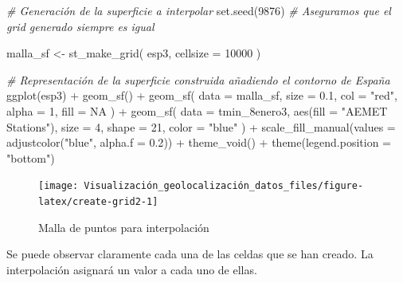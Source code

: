 \documentclass[
]{report}
\newenvironment{Shaded}{\begin{snugshade}}{\end{snugshade}}
\newcommand{\AttributeTok}[1]{\textcolor[rgb]{0.77,0.63,0.00}{#1}}
\newcommand{\CommentTok}[1]{\textcolor[rgb]{0.56,0.35,0.01}{\textit{#1}}}
\newcommand{\ConstantTok}[1]{\textcolor[rgb]{0.00,0.00,0.00}{#1}}
\newcommand{\DecValTok}[1]{\textcolor[rgb]{0.00,0.00,0.81}{#1}}
\newcommand{\FloatTok}[1]{\textcolor[rgb]{0.00,0.00,0.81}{#1}}
\newcommand{\FunctionTok}[1]{\textcolor[rgb]{0.00,0.00,0.00}{#1}}
\newcommand{\NormalTok}[1]{#1}
\newcommand{\OtherTok}[1]{\textcolor[rgb]{0.56,0.35,0.01}{#1}}
\newcommand{\SpecialCharTok}[1]{\textcolor[rgb]{0.00,0.00,0.00}{#1}}
\newcommand{\StringTok}[1]{\textcolor[rgb]{0.31,0.60,0.02}{#1}}
\theoremstyle{definition}
\theoremstyle{definition}
\theoremstyle{definition}
\theoremstyle{definition}
\theoremstyle{remark}
\begin{document}
\begin{Shaded}
\begin{Highlighting}[]

\CommentTok{\# Generación de la superficie a interpolar}
\FunctionTok{set.seed}\NormalTok{(}\DecValTok{9876}\NormalTok{) }\CommentTok{\# Aseguramos que el grid generado siempre es igual}

\NormalTok{malla\_sf }\OtherTok{\textless{}{-}} \FunctionTok{st\_make\_grid}\NormalTok{(}
\NormalTok{  esp3,}
  \AttributeTok{cellsize =} \DecValTok{10000}
\NormalTok{)}

\CommentTok{\# Representación de la superficie construida añadiendo el contorno de España}
\FunctionTok{ggplot}\NormalTok{(esp3) }\SpecialCharTok{+}
  \FunctionTok{geom\_sf}\NormalTok{() }\SpecialCharTok{+}
  \FunctionTok{geom\_sf}\NormalTok{(}
    \AttributeTok{data =}\NormalTok{ malla\_sf,}
    \AttributeTok{size =} \FloatTok{0.1}\NormalTok{,}
    \AttributeTok{col =} \StringTok{"red"}\NormalTok{, }\AttributeTok{alpha =} \DecValTok{1}\NormalTok{,}
    \AttributeTok{fill =} \ConstantTok{NA}
\NormalTok{  ) }\SpecialCharTok{+}
  \FunctionTok{geom\_sf}\NormalTok{(}
    \AttributeTok{data =}\NormalTok{ tmin\_8enero3,}
    \FunctionTok{aes}\NormalTok{(}\AttributeTok{fill =} \StringTok{"AEMET Stations"}\NormalTok{), }\AttributeTok{size =} \DecValTok{4}\NormalTok{, }\AttributeTok{shape =} \DecValTok{21}\NormalTok{,}
    \AttributeTok{color =} \StringTok{"blue"}
\NormalTok{  ) }\SpecialCharTok{+}
  \FunctionTok{scale\_fill\_manual}\NormalTok{(}\AttributeTok{values =} \FunctionTok{adjustcolor}\NormalTok{(}\StringTok{"blue"}\NormalTok{, }\AttributeTok{alpha.f =} \FloatTok{0.2}\NormalTok{)) }\SpecialCharTok{+}
  \FunctionTok{theme\_void}\NormalTok{() }\SpecialCharTok{+}
  \FunctionTok{theme}\NormalTok{(}\AttributeTok{legend.position =} \StringTok{"bottom"}\NormalTok{)}
\end{Highlighting}
\end{Shaded}

\begin{figure}

{\centering \texttt{[image: Visualización\_geolocalización\_datos\_files/figure-latex/create-grid2-1]} 

}

\caption{Malla de puntos para interpolación}\label{fig:create-grid2}
\end{figure}

Se puede observar claramente cada una de las celdas que se han creado. La
interpolación asignará un valor a cada uno de ellas.
\end{document}
